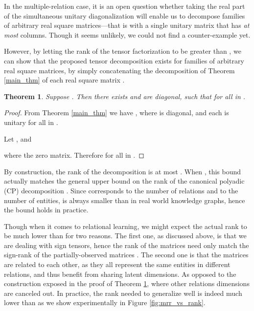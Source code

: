 \documentclass[twoside,11pt]{article}
\renewcommand{\cite}{\citep}
\newtheorem{thm}{Theorem}
\begin{document}
In the multiple-relation case, it is an open question whether 
taking the real part of the simultaneous unitary diagonalization will enable 
us to decompose families of arbitrary real square 
matrices---that is with a single unitary matrix  that has \emph{at most}  columns.
Though it seems unlikely, we could not find a counter-example yet.

However, by letting the rank of the tensor factorization  to be greater than ,
we can show that the proposed tensor decomposition exists for families of arbitrary real square 
matrices, by simply concatenating the decomposition of Theorem \ref{main_thm} 
of each real square matrix .

\begin{thm}
    \label{thm:main_thm_tensors}
    Suppose . Then there exists  and 
     are diagonal, 
    such that  for all  in .
\end{thm}
\begin{proof}
From Theorem \ref{main_thm} we have , 
where  is diagonal,
and each  is unitary for all  in .

Let , and

where  the zero  matrix.
Therefore  for all  in .
\end{proof}

By construction, the rank of the decomposition is at most . 
When , this bound actually matches the general upper bound on 
the rank of the canonical polyadic (CP) decomposition
\cite{hitchcock-sum-1927,kruskal1989rank}. Since  corresponds to the number of relations and 
to the number of entities,  is always smaller than  in real world knowledge graphs,
hence the bound holds in practice.


Though when it comes to relational learning, we might expect
the actual rank to be much lower than  for two reasons. The first one, as discussed
above, is that we are dealing with sign tensors, hence the rank
of the matrices  need only match the sign-rank of the
partially-observed matrices .
The second one is that the matrices are related to each other,
as they all represent the same entities in different relations,
and thus benefit from sharing latent dimensions. As opposed to the construction
exposed in the proof of Theorem \ref{thm:main_thm_tensors}, where
other relations dimensions are canceled out. In practice,
the rank needed to generalize well is indeed much lower than  as we
show experimentally in Figure \ref{fig:mrr_vs_rank}. 
\end{document}
